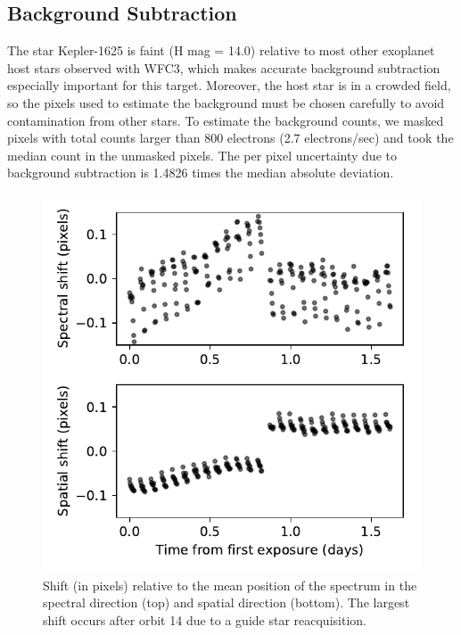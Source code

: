\documentclass[twocolumn]{aastex62}
\begin{document}


\subsection{Background Subtraction} 
\label{sec:background} 
The star Kepler-1625 is faint (H mag = 14.0) relative to most other exoplanet host stars observed with WFC3, which makes accurate background subtraction especially important for this target. Moreover, the host star is in a crowded field, so the pixels used to estimate the background must be chosen carefully to avoid contamination from other stars.  To estimate the background counts, we masked pixels with total counts larger than 800 electrons (2.7 electrons/sec) and took the median count in the unmasked pixels. The per pixel uncertainty due to background subtraction is 1.4826 times the median absolute deviation.




\begin{figure}
\includegraphics[width = 0.5 \textwidth]{fig1_shifts.pdf}
    \caption{Shift (in pixels) relative to the mean position of the spectrum in the spectral direction (top) and spatial direction (bottom). The largest shift occurs after orbit 14 due to a guide star reacquisition.}
\label{fig:shifts}
\end{figure}
\end{document}
